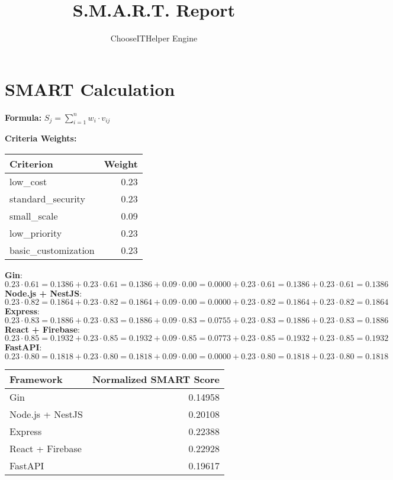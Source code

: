 \documentclass{article}
\title{S.M.A.R.T. Report}
\author{ChooseITHelper Engine}
\begin{document}
\maketitle
\section*{SMART Calculation}
\textbf{Formula:} $S_j = \sum_{i=1}^{n} w_i \cdot v_{ij}$
\par\vspace{1em}
\textbf{Criteria Weights:}
\begin{longtable}{l r} \toprule Criterion & Weight \\ \midrule
low\_cost & 0.23 \\
standard\_security & 0.23 \\
small\_scale & 0.09 \\
low\_priority & 0.23 \\
basic\_customization & 0.23 \\
\bottomrule \end{longtable}
\par\vspace{1em}
\textbf{Gin}: $0.23 \cdot 0.61 = 0.1386 + 0.23 \cdot 0.61 = 0.1386 + 0.09 \cdot 0.00 = 0.0000 + 0.23 \cdot 0.61 = 0.1386 + 0.23 \cdot 0.61 = 0.1386$\\[0.5em]
\textbf{Node.js + NestJS}: $0.23 \cdot 0.82 = 0.1864 + 0.23 \cdot 0.82 = 0.1864 + 0.09 \cdot 0.00 = 0.0000 + 0.23 \cdot 0.82 = 0.1864 + 0.23 \cdot 0.82 = 0.1864$\\[0.5em]
\textbf{Express}: $0.23 \cdot 0.83 = 0.1886 + 0.23 \cdot 0.83 = 0.1886 + 0.09 \cdot 0.83 = 0.0755 + 0.23 \cdot 0.83 = 0.1886 + 0.23 \cdot 0.83 = 0.1886$\\[0.5em]
\textbf{React + Firebase}: $0.23 \cdot 0.85 = 0.1932 + 0.23 \cdot 0.85 = 0.1932 + 0.09 \cdot 0.85 = 0.0773 + 0.23 \cdot 0.85 = 0.1932 + 0.23 \cdot 0.85 = 0.1932$\\[0.5em]
\textbf{FastAPI}: $0.23 \cdot 0.80 = 0.1818 + 0.23 \cdot 0.80 = 0.1818 + 0.09 \cdot 0.00 = 0.0000 + 0.23 \cdot 0.80 = 0.1818 + 0.23 \cdot 0.80 = 0.1818$\\[0.5em]
\vspace{1em}
\begin{longtable}{l r} \toprule Framework & Normalized SMART Score \\ \midrule
Gin & 0.14958 \\
Node.js + NestJS & 0.20108 \\
Express & 0.22388 \\
React + Firebase & 0.22928 \\
FastAPI & 0.19617 \\
\bottomrule \end{longtable}
\end{document}
